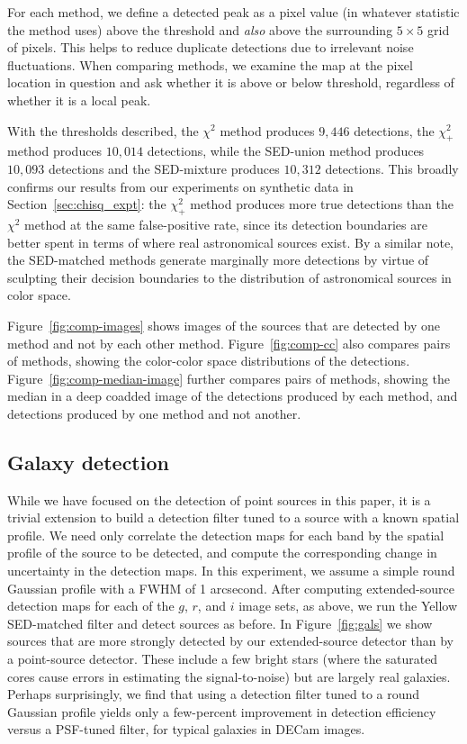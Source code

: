 \documentclass[11pt,letterpaper,linenumbers]{aastex7}
\newcommand{\secref}[1]{\mbox{Section~\ref{#1}}}
\newcommand{\figref}[1]{\mbox{Figure~\ref{#1}}}
\newcommand{\chipos}{\chi_+}
\begin{document}
For each method, we define a detected peak as a pixel value (in
whatever statistic the method uses) above the threshold and
\emph{also} above the surrounding $5 \times 5$ grid of pixels.  This
helps to reduce duplicate detections due to irrelevant noise
fluctuations.  When comparing methods, we examine the map at the pixel
location in question and ask whether it is above or below threshold,
regardless of whether it is a local peak.

With the thresholds described, the $\chi^2$ method produces $9,446$
detections, the $\chipos^2$ method produces $10,014$ detections, while
the SED-union method produces $10,093$ detections and the SED-mixture
produces $10,312$ detections.  This broadly confirms our results from
our experiments on synthetic data in \secref{sec:chisq_expt}: the
$\chipos^2$ method produces more true detections than the $\chi^2$
method at the same false-positive rate, since its detection boundaries
are better spent in terms of where real astronomical sources exist.
By a similar note, the SED-matched methods generate marginally more
detections by virtue of sculpting their decision boundaries to the
distribution of astronomical sources in color space.


\figref{fig:comp-images} shows images of the sources that are detected
by one method and not by each other method.
\figref{fig:comp-cc} also compares pairs of methods, showing the
color-color space distributions of the detections.
\figref{fig:comp-median-image} further compares pairs of methods, showing
the median in a deep coadded image of the detections produced by each method,
and detections produced by one method and not another.

\subsection{Galaxy detection}

While we have focused on the detection of point sources in this paper,
it is a trivial extension to build a detection filter tuned to a
source with a known spatial profile.  We need only correlate the
detection maps for each band by the spatial profile of the source to
be detected, and compute the corresponding change in uncertainty in
the detection maps.  In this experiment, we assume a simple round
Gaussian profile with a FWHM of 1 arcsecond.  After computing
extended-source detection maps for each of the $g$, $r$, and $i$ image
sets, as above, we run the Yellow SED-matched filter and detect
sources as before.  In \figref{fig:gals} we show sources that are more
strongly detected by our extended-source detector than by a
point-source detector.  These include a few bright stars (where the
saturated cores cause errors in estimating the signal-to-noise) but
are largely real galaxies.  Perhaps surprisingly, we find that using a
detection filter tuned to a round Gaussian profile yields only a
few-percent improvement in detection efficiency versus a PSF-tuned
filter, for typical galaxies in DECam images.
\end{document}

